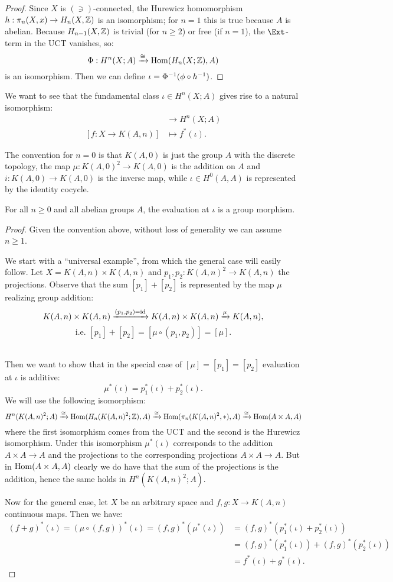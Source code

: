 \begin{proof}
Since $X$ is $(\ni)$-connected, the Hurewicz homomorphism $h:\pi_n(X,x)\to H_n(X,{\mathbb Z})$ is an isomorphism; for $n=1$ this is true because $A$ is abelian. Because $H_{n-1}(X,{\mathbb Z})$ is trivial (for $n\ge2$) or free (if $n=1$), the $\Ext$-term in the UCT vanishes, so:
\[\Phi:H^n(X;A)\xrightarrow{\cong}\operatorname{Hom}(H_n(X;{\mathbb Z}),A)\]
is an isomorphism. Then we can define $\iota=\Phi^\inv(\phi\circ h^\inv)$.
\end{proof}

We want to see that the fundamental class $\iota\in H^n(X;A)$ gives rise to a natural isomorphism:
\begin{align*}
[X,K(A,n)]&\to H^n(X;A)\\
[f:X\to K(A,n)]&\mapsto f^*(\iota).
\end{align*}

The convention for $n=0$ is that $K(A,0)$ is just the group $A$ with the discrete topology, the map $\mu:K(A,0)^2\to K(A,0)$ is the addition on $A$ and $i: K(A,0)\to K(A,0)$ is the inverse map, while $\iota\in H^0(A,A)$ is represented by the identity cocycle.

\begin{theorem}
For all $n\ge0$ and all abelian groups $A$, the evaluation at $\iota$ is a group morphism.
\end{theorem}

\begin{proof}
Given the convention above, without loss of generality we can assume $n\ge1$.

We start with a \enquote{universal example}, from which the general case will easily follow. Let $X=K(A,n)\times K(A,n)$ and $p_1,p_2:K(A,n)^2\to K(A,n)$ the projections. Observe that the sum $[p_1]+[p_2]$ is represented by the map $\mu$ realizing group addition:
\[
K(A,n)\times K(A,n)\xrightarrow{(p_1,p_2)=\operatorname{id}}K(A,n)\times K(A,n)\xrightarrow{\mu}K(A,n),\]
\[\text{i.e. } [p_1]+[p_2]=[\mu\circ(p_1,p_2)]=[\mu].
\]\ 

Then we want to show that in the special case of $[\mu]=[p_1]=[p_2]$ evaluation at $\iota$ is additive:
\[\mu^*(\iota)=p_1^*(\iota)+p_2^*(\iota).\]
We will use the following isomorphism:
{\small
\[ H^n(K(A,n)^2;A)\xrightarrow{\cong}\operatorname{Hom}(H_n(K(A,n)^2;{\mathbb Z}),A)\xrightarrow{\cong}\operatorname{Hom}(\pi_n(K(A,n)^2,*),A)\xrightarrow{\cong}\operatorname{Hom}(A\times A,A)\]}
where the first isomorphism comes from the UCT and the second is the Hurewicz isomorphism. Under this isomorphism $\mu^*(\iota)$ corresponds to the addition $A\times A\to A$ and the projections to the corresponding projections $A\times A\to A$. But in $\operatorname{Hom}(A\times A,A)$ clearly we do have that the sum of the projections is the addition, hence the same holds in $H^n(K(A,n)^2;A)$.

Now for the general case, let $X$ be an arbitrary space and $f,g:X\to K(A,n)$ continuous maps. Then we have:
\begin{align*}
(f+g)^*(\iota)=(\mu\circ(f,g))^*(\iota)=(f,g)^*(\mu^*(\iota))&=(f,g)^*(p_1^*(\iota)+p_2^*(\iota))\\
&=(f,g)^*(p_1^*(\iota))+(f,g)^*(p_2^*(\iota))\\
&=f^*(\iota)+g^*(\iota).
\end{align*}
\end{proof}


